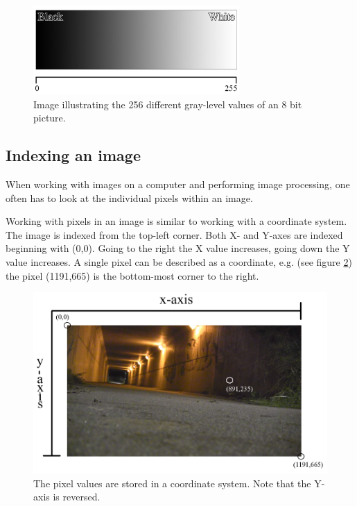 \begin{figure}[htbp]
\centering
\includegraphics[width=0.7\textwidth]{Pictures/Theory/Grayscale.jpg}
\caption{Image illustrating the 256 different gray-level values of an 8 bit picture.}
\label{fig:ip_grayscale}
\end{figure}
 
\subsection{Indexing an image}
When working with images on a computer and performing image processing, one often has to look at the individual pixels within an image.

Working with pixels in an image is similar to working with a coordinate system. The image is indexed from the top-left corner. Both X- and Y-axes are indexed beginning with (0,0). Going to the right the X value increases, going down the Y value increases. A single pixel can be described as a coordinate, e.g. (see figure \ref{fig:ip_IndexingAPicture}) the pixel (1191,665) is the bottom-most corner to the right.

\begin{figure}[htbp]
\centering
\includegraphics[width=1.00\textwidth]{Pictures/Theory/IndexingAPicture}
\caption{The pixel values are stored in a coordinate system. Note that the Y-axis is reversed.}
\label{fig:ip_IndexingAPicture}
\end{figure}

